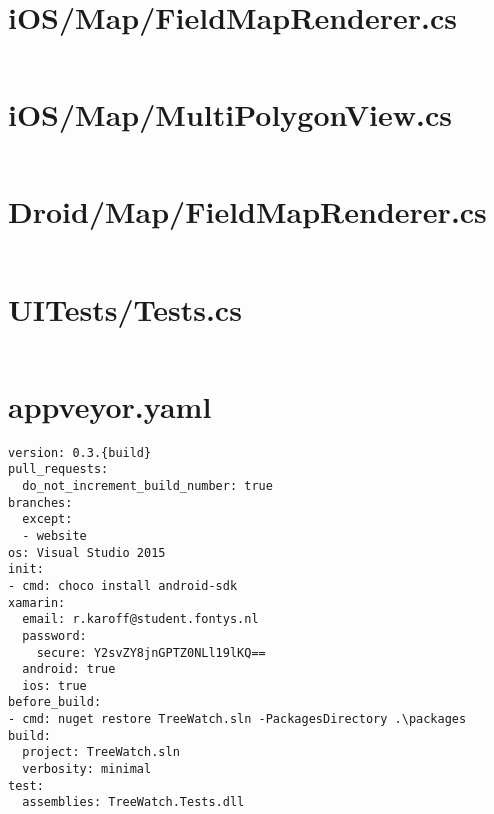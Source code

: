 \documentclass[12pt]{article}
\begin{document}
\section{iOS/Map/FieldMapRenderer.cs}
\inputminted[linenos,firstline=22]{csharp}{../../../src/iOS/Map/FieldMapRenderer.cs}


\section{iOS/Map/MultiPolygonView.cs}
\inputminted[linenos,firstline=22]{csharp}{../../../src/iOS/Map/MultiPolygonView.cs}

\section{Droid/Map/FieldMapRenderer.cs}
\inputminted[linenos,firstline=22]{csharp}{../../../src/Droid/Map/FieldMapRenderer.cs}

\section{UITests/Tests.cs}
\inputminted[linenos,firstline=22]{csharp}{../../../src/UITests/Tests.cs}

\section{appveyor.yaml}
\begin{verbatim}
version: 0.3.{build}
pull_requests:
  do_not_increment_build_number: true
branches:
  except:
  - website
os: Visual Studio 2015
init:
- cmd: choco install android-sdk
xamarin:
  email: r.karoff@student.fontys.nl
  password:
    secure: Y2svZY8jnGPTZ0NLl19lKQ==
  android: true
  ios: true
before_build:
- cmd: nuget restore TreeWatch.sln -PackagesDirectory .\packages
build:
  project: TreeWatch.sln
  verbosity: minimal
test:
  assemblies: TreeWatch.Tests.dll
\end{verbatim}
\end{document}
